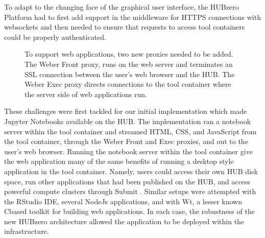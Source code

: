 \documentclass[conference]{../sty/IEEEtran}
\newcommand\CC{C\nolinebreak[4]\hspace{-.05em}\raisebox{.4ex}{\relsize{-3}{\textbf{++}}}\hspace{.25em}}
\begin{document}
To adapt to the changing face of the graphical user interface, the HUBzero
Platform had to first add support in the middleware for HTTPS connections with
websockets and then needed to ensure that requests to access tool containers
could be properly authenticated.

\begin{figure}[H]
  \centering
  \caption{To support web applications, two new proxies needed to be added.
The Weber Front proxy, runs on the web server and terminates an SSL connection
between the user's web browser and the HUB. The Weber Exec proxy directs
connections to the tool container where the server side of web applications
 run.}
  \label{fig_arch}
\end{figure}



These challenges were first tackled for our initial implementation which made
Jupyter Notebooks available on the HUB. The implementation ran a notebook
server within the tool container and streamed HTML, CSS, and JavaScript from
the tool container, through the Weber Front and Exec proxies, and out to the
user's web browser. Running the notebook server within the tool container give
the web application many of the same benefits of running a desktop style
application in the tool container. Namely, users could access their own HUB
disk space, run other applications that had been published on the HUB, and
access powerful compute clusters through Submit \cite{submit}. Similar setups
were attempted with the RStudio IDE, several NodeJs applications, and with Wt,
a lesser known \CC based toolkit for building web applications. In each case,
the robustness of the new HUBzero architecture allowed the application to be
deployed within the infrastructure.
\end{document}
